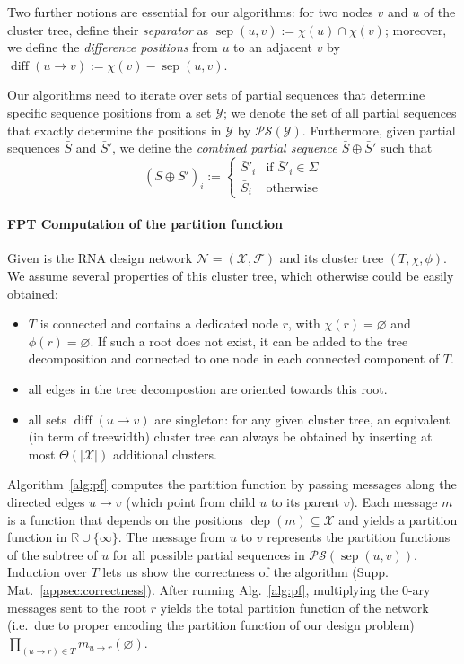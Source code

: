 \documentclass{bmcart}
\newcommand{\network}{\mathcal{N}}
\newcommand{\val}{\bar S} %
\newcommand{\dep}{\operatorname{dep}}
\newcommand{\separator}[2]{\operatorname{sep}(#1,#2)}
\newcommand{\difference}[2]{\operatorname{diff}(#1 \rightarrow #2)}
\newcommand{\real}{\mathbb{R}}
\newcommand{\Message}[2]{m_{#1\rightarrow #2}}
\newcommand{\partseqs}{\mathcal{P\!S}}
\newcommand{\F}{\mathcal{F}}
\newcommand{\X}{\mathcal{X}}
\newcommand{\Y}{\mathcal{Y}}
\newcommand{\Def}[1]{\emph{#1}}
\newcommand{\substitute}[2]{#1\!\oplus\!#2}
\newcommand{\evalfor}[2]{#1(#2)}
\begin{document}
Two further notions are essential for our algorithms: for two nodes $v$ and $u$ of the cluster tree, define
their \Def{separator} as $\separator{u}{v} := \chi(u)\cap\chi(v)$;
moreover, we define the \Def{difference positions} from $u$ to an
adjacent $v$ by $\difference{u}{v}:=\chi(v) - \separator{u}{v}$.

Our algorithms need to iterate over sets of partial sequences that determine specific sequence positions
from a set $\Y$; we denote the set of all partial sequences that exactly determine the positions in $\Y$ by $\partseqs(\Y)$.
Furthermore, given partial sequences $\val$ and
$\val'$, we define the \Def{combined partial sequence $\substitute{\val}{\val'}$} such that
$$
(\substitute{\val}{\val'})_i :=
\begin{cases}
  \val'_i & \text{if } \val'_i\in \Sigma\\
  \val_i & \text{otherwise}
\end{cases}
$$


\paragraph{FPT Computation of the partition function}
Given is the RNA design network $\network=(\X,\F)$ and its cluster
tree $(T,\chi,\phi)$.  
%
We assume several properties of this cluster tree, which otherwise could be easily obtained:
\begin{itemize}
\item
$T$ is
connected and contains a dedicated node $r$, with
$\chi(r)=\varnothing$ and $\phi(r)=\varnothing$. If such a root does not exist, it can be added to the tree decomposition and connected to one node in each connected component of $T$.
\item
all edges in the tree decompostion are oriented towards this root.
\item
all sets $\difference{u}{v}$ are singleton: for any given
cluster tree, an equivalent (in term of treewidth) cluster tree can
always be obtained by inserting at most $\Theta(|\X|)$ additional
clusters.
\end{itemize}

Algorithm~\ref{alg:pf} computes the partition function by passing
messages along the directed edges $u\to v$ (which point from 
child $u$ to its parent $v$). Each message $m$ is a function that depends
on the positions $\dep(m)\subseteq \X$ and yields a partition function
in $\real\cup\{\infty\}$. The message from $u$ to $v$ represents the
partition functions of the subtree of $u$ for all possible partial
sequences in $\partseqs(\separator{u}{v})$. Induction over $T$ lets us show
the correctness of the algorithm
(Supp. Mat.~\ref{appsec:correctness}).  After running
Alg.~\ref{alg:pf}, multiplying the 0-ary messages sent to the root $r$
yields the total partition function of the network (i.e.~due to proper encoding the partition function of our design problem)
\begin{math}
  \prod_{(u\to{}r)\in T} \evalfor{\Message{u}{r}}{\varnothing}.
\end{math}
\end{document}

